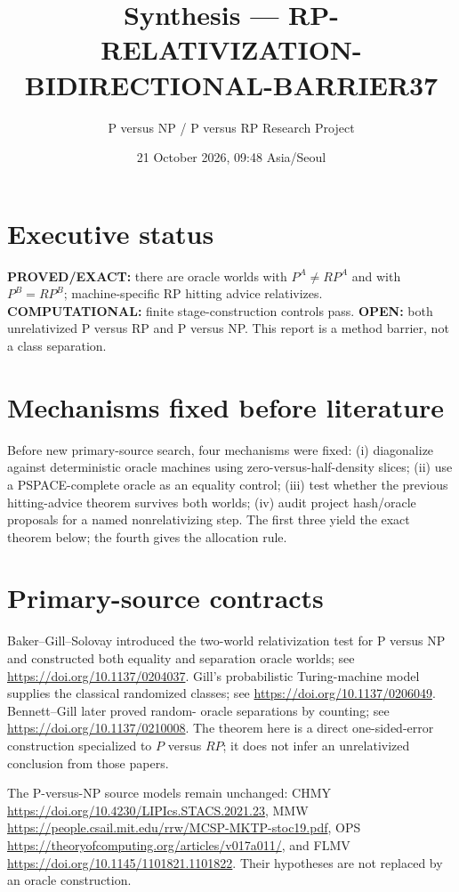 \documentclass[11pt]{article}
\title{Synthesis --- RP-RELATIVIZATION-BIDIRECTIONAL-BARRIER37}
\author{P versus NP / P versus RP Research Project}
\date{21 October 2026, 09:48 Asia/Seoul}
\begin{document}
\maketitle

\section*{Executive status}
\textbf{PROVED/EXACT:} there are oracle worlds with $P^A\ne RP^A$ and with
$P^B=RP^B$; machine-specific RP hitting advice relativizes.
\textbf{COMPUTATIONAL:} finite stage-construction controls pass.
\textbf{OPEN:} both unrelativized P versus RP and P versus NP.  This report is
a method barrier, not a class separation.

\section*{Mechanisms fixed before literature}
Before new primary-source search, four mechanisms were fixed: (i) diagonalize
against deterministic oracle machines using zero-versus-half-density slices;
(ii) use a PSPACE-complete oracle as an equality control; (iii) test whether
the previous hitting-advice theorem survives both worlds; (iv) audit project
hash/oracle proposals for a named nonrelativizing step.  The first three yield
the exact theorem below; the fourth gives the allocation rule.

\section*{Primary-source contracts}
Baker--Gill--Solovay introduced the two-world relativization test for P versus
NP and constructed both equality and separation oracle worlds; see
\url{https://doi.org/10.1137/0204037}.  Gill's probabilistic Turing-machine
model supplies the classical randomized classes; see
\url{https://doi.org/10.1137/0206049}.  Bennett--Gill later proved random-
oracle separations by counting; see \url{https://doi.org/10.1137/0210008}.
The theorem here is a direct one-sided-error construction specialized to
$P$ versus $RP$; it does not infer an unrelativized conclusion from those
papers.

The P-versus-NP source models remain unchanged: CHMY
\url{https://doi.org/10.4230/LIPIcs.STACS.2021.23}, MMW
\url{https://people.csail.mit.edu/rrw/MCSP-MKTP-stoc19.pdf}, OPS
\url{https://theoryofcomputing.org/articles/v017a011/}, and FLMV
\url{https://doi.org/10.1145/1101821.1101822}.  Their hypotheses are not
replaced by an oracle construction.
\end{document}
